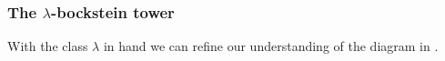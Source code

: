 

\subsubsection{The $\lambda$-bockstein tower}\hfill

With the class $\lambda$ in hand we can refine our understanding of the diagram in .

